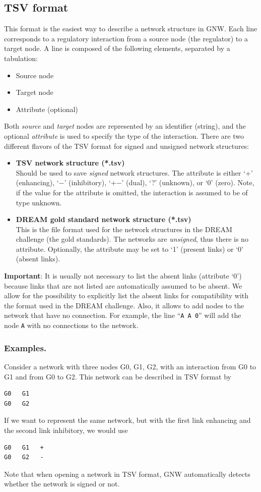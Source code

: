\documentclass{llncs}
\newenvironment{mylist}{
\begin{itemize}
}{\end{itemize}}
\begin{document}
\subsection{TSV format}
\label{tsv-formats}
This format is the easiest way to describe a network structure in GNW. Each line corresponds to a regulatory interaction from a source node (the regulator) to a target node. A line is composed of the following elements, separated by a tabulation:
\begin{mylist}
 \item Source node
 \item Target node
 \item Attribute (optional)
\end{mylist}
Both \emph{source} and \emph{target} nodes are represented by an identifier (string), and the optional \emph{attribute} is used to specify the type of the interaction. There are two different flavors of the TSV format for signed and unsigned network structures:
\begin{mylist}
\item \textbf{TSV network structure (*.tsv)}\\Should be used to save \emph{signed} network structures. The attribute is either `+' (enhancing), `$-$' (inhibitory), `+$-$' (dual), `?' (unknown), or `0' (zero). Note, if the value for the attribute is omitted, the interaction is assumed to be of type unknown.\\
 \item \textbf{DREAM gold standard network structure (*.tsv)}\\This is the file format used for the network structures in the DREAM challenge (the gold standards). The networks are \emph{unsigned}, thus there is no attribute. Optionally, the attribute may be set to `1' (present links) or `0' (absent links).
\end{mylist}

\textbf{Important}: It is usually not necessary to list the absent links (attribute `0') because links that are not listed are automatically assumed to be absent. We allow for the possibility to explicitly list the absent links for compatibility with the format used in the DREAM challenge. Also, it allows to add nodes to the network that have no connection. For example, the line ``\texttt{A  A  0}'' will add the node \texttt{A} with no connections to the network.

\subsubsection{Examples.} Consider a network with three nodes G0, G1, G2, with an interaction from G0 to G1 and from G0 to G2. This network can be described in TSV format by
\begin{verbatim}
G0   G1
G0   G2
\end{verbatim}
If we want to represent the same network, but with the first link enhancing and the second link inhibitory, we would use
\begin{verbatim}
G0   G1   +
G0   G2   -
\end{verbatim}
Note that when opening a network in TSV format, GNW automatically detects whether the network is signed or not.
\end{document}
